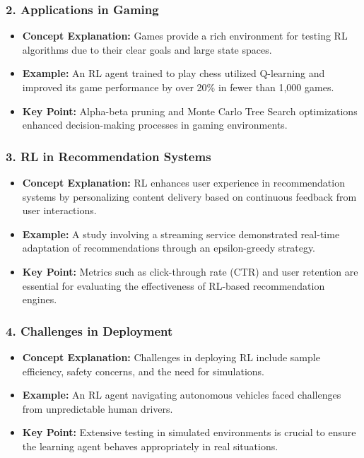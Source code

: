 \documentclass[aspectratio=169]{beamer}
\begin{document}
\begin{frame}[fragile]
    \frametitle{2. Applications in Gaming}
    \begin{itemize}
        \item \textbf{Concept Explanation:} 
        Games provide a rich environment for testing RL algorithms due to their clear goals and large state spaces.
        \item \textbf{Example:} 
        An RL agent trained to play chess utilized Q-learning and improved its game performance by over 20\% in fewer than 1,000 games.
        \item \textbf{Key Point:} 
        Alpha-beta pruning and Monte Carlo Tree Search optimizations enhanced decision-making processes in gaming environments.
    \end{itemize}
\end{frame}

\begin{frame}[fragile]
    \frametitle{3. RL in Recommendation Systems}
    \begin{itemize}
        \item \textbf{Concept Explanation:} 
        RL enhances user experience in recommendation systems by personalizing content delivery based on continuous feedback from user interactions.
        \item \textbf{Example:} 
        A study involving a streaming service demonstrated real-time adaptation of recommendations through an epsilon-greedy strategy.
        \item \textbf{Key Point:} 
        Metrics such as click-through rate (CTR) and user retention are essential for evaluating the effectiveness of RL-based recommendation engines.
    \end{itemize}
\end{frame}

\begin{frame}[fragile]
    \frametitle{4. Challenges in Deployment}
    \begin{itemize}
        \item \textbf{Concept Explanation:} 
        Challenges in deploying RL include sample efficiency, safety concerns, and the need for simulations.
        \item \textbf{Example:} 
        An RL agent navigating autonomous vehicles faced challenges from unpredictable human drivers.
        \item \textbf{Key Point:} 
        Extensive testing in simulated environments is crucial to ensure the learning agent behaves appropriately in real situations.
    \end{itemize}
\end{frame}
\end{document}
